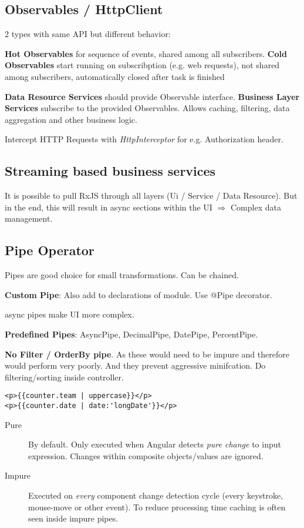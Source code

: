 \begin{multicols*}{2}
\subsection{Observables / HttpClient}
2 types with same API but different behavior:

\textbf{Hot Observables} for sequence of events, shared among all subscribers.
\textbf{Cold Observables} start running on subscribption (e.g. web requests), not shared among subscribers, automatically closed after task is finished

\textbf{Data Resource Services} should provide Observable interface.
\textbf{Business Layer Services} subscribe to the provided Observables. Allows caching, filtering, data aggregation and other business logic.

Intercept HTTP Requests with \textit{HttpInterceptor} for e.g. Authorization header.

\subsection{Streaming based business services}
It is possible to pull RxJS through all layers (Ui / Service / Data Resource). But in the end, this will result in async sections within the UI \(\Rightarrow\) Complex data management.

\subsection{Pipe Operator}
Pipes are good choice for small transformations. Can be chained.

\textbf{Custom Pipe}: Also add to declarations of module. Use @Pipe decorator.

async pipes make UI more complex.

\textbf{Predefined Pipes}: AsyncPipe, DecimalPipe, DatePipe, PercentPipe.

\textbf{No Filter / OrderBy pipe}. As these would need to be impure and therefore would perform very poorly. And they prevent aggressive minifcation. Do filtering/sorting inside controller.

\begin{verbatim}
<p>{{counter.team | uppercase}}</p>
<p>{{counter.date | date:'longDate'}}</p>
\end{verbatim}

\begin{description}
    \item[Pure] By default. Only executed when Angular detects \textit{pure change} to input expression. Changes within composite objects/values are ignored.
    \item[Impure] Executed on \textit{every} component change detection cycle (every keystroke, mouse-move or other event). To reduce processing time caching is often seen inside impure pipes.
\end{description}


\end{multicols*}
